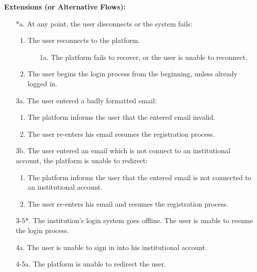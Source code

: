 \begin{itemize}[label={[\textbf{UC}]}, align=left, leftmargin=*]
    \textbf{Extensions (or Alternative Flows):} 
    \begin{enumerate}[label=\arabic*.]
        \item[*a.] At any point, the user disconnects or the system fails:
            \begin{enumerate}[label=\arabic*.]
                \item The user reconnects to the platform.
                    \begin{enumerate}[label=\alph*.]
                        \item[1a.] The platform fails to recover, or the user is unable to reconnect.
                    \end{enumerate}
                 \item The user begins the login process from the beginning, unless already logged in.
            \end{enumerate}
        \item[3a.] The user entered a badly formatted email:
            \begin{enumerate}[label=\arabic*.]
                \item The platform informs the user that the entered email invalid.
                \item The user re-enters his email resumes the registration process.
            \end{enumerate}
        \item[3b.] The user entered an email which is not connect to an institutional account, the platform is unable to redirect:
            \begin{enumerate}[label=\arabic*.]
                \item The platform informs the user that the entered email is not connected to an institutional account.
                \item The user re-enters his email and resumes the registration process.
            \end{enumerate}
        \item[3-5*.] The institution's login system goes offline. The user is unable to resume the login process.
        \item[4a.] The user is unable to sign in into his institutional account.
        \item[4-5a.] The platform is unable to redirect the user.
        \end{enumerate}
     

\end{itemize}
